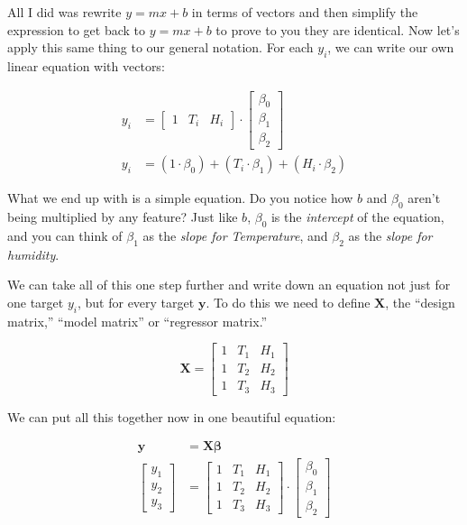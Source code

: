 \noindent All I did was rewrite $y=mx+b$ in terms of vectors and then simplify the expression to get back to $y=mx+b$ to prove to you they are identical. Now let's apply this same thing to our general notation. For each $y_i$, we can write our own linear equation with vectors:

\begin{align*}
    y_i &= 
    \begin{bmatrix}
        1 & T_i & H_i
    \end{bmatrix}
    \cdot
    \begin{bmatrix}
        \beta_0 \\
        \beta_1 \\
        \beta_2
    \end{bmatrix} \\
    y_i &= (1 \cdot \beta_0) +  (T_i \cdot \beta_1) + (H_i\cdot \beta_2)
\end{align*}

\noindent What we end up with is a simple equation. Do you notice how $b$ and $\beta_0$ aren't being multiplied by any feature? Just like $b$, $\beta_0$ is the \textit{intercept} of the equation, and you can think of $\beta_1$ as the \textit{slope for Temperature}, and $\beta_2$ as the \textit{slope for humidity}.

We can take all of this one step further and write down an equation not just for one target $y_i$, but for every target $\mathbf{y}$. To do this we need to define $\mathbf{X}$, the ``design matrix,'' ``model matrix'' or ``regressor matrix.''

\begin{equation}\label{eq:X}
    \mathbf{X} = 
    \begin{bmatrix}
        1 & T_1 & H_1 \\
        1 & T_2 & H_2 \\
        1 & T_3 & H_3
    \end{bmatrix}
\end{equation}

\noindent We can put all this together now in one beautiful equation:

\begin{align}
    \label{eq:linearmodel1}
    \mathbf{y} &= \mathbf{X} \boldsymbol{\beta} \\
    \label{eq:linearmodel2}
    \begin{bmatrix}
        y_1 \\
        y_2 \\
        y_3
    \end{bmatrix} &=
    \begin{bmatrix}
        1 & T_1 & H_1 \\
        1 & T_2 & H_2 \\
        1 & T_3 & H_3
    \end{bmatrix} \cdot
    \begin{bmatrix}
        \beta_0 \\
        \beta_1 \\
        \beta_2
    \end{bmatrix}
\end{align}


